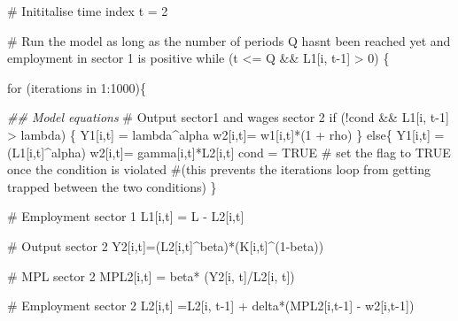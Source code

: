 \documentclass[
  letterpaper,
  DIV=11,
  numbers=noendperiod]{scrreprt}
\newenvironment{Shaded}{\begin{snugshade}}{\end{snugshade}}
\newcommand{\CommentTok}[1]{\textcolor[rgb]{0.37,0.37,0.37}{#1}}
\newcommand{\ConstantTok}[1]{\textcolor[rgb]{0.56,0.35,0.01}{#1}}
\newcommand{\ControlFlowTok}[1]{\textcolor[rgb]{0.00,0.23,0.31}{#1}}
\newcommand{\DecValTok}[1]{\textcolor[rgb]{0.68,0.00,0.00}{#1}}
\newcommand{\DocumentationTok}[1]{\textcolor[rgb]{0.37,0.37,0.37}{\textit{#1}}}
\newcommand{\NormalTok}[1]{\textcolor[rgb]{0.00,0.23,0.31}{#1}}
\newcommand{\OtherTok}[1]{\textcolor[rgb]{0.00,0.23,0.31}{#1}}
\newcommand{\SpecialCharTok}[1]{\textcolor[rgb]{0.37,0.37,0.37}{#1}}
\begin{document}
\begin{Shaded}
\begin{Highlighting}[]
  \CommentTok{\# Inititalise time index}
\NormalTok{  t }\OtherTok{=} \DecValTok{2}
  
  \CommentTok{\# Run the model as long as the number of periods Q hasn\textquotesingle{}t been reached yet and employment in sector 1 is positive }
  \ControlFlowTok{while}\NormalTok{ (t }\SpecialCharTok{\textless{}=}\NormalTok{ Q }\SpecialCharTok{\&\&}\NormalTok{ L1[i, t}\DecValTok{{-}1}\NormalTok{] }\SpecialCharTok{\textgreater{}} \DecValTok{0}\NormalTok{) \{}
    
   \ControlFlowTok{for}\NormalTok{ (iterations }\ControlFlowTok{in} \DecValTok{1}\SpecialCharTok{:}\DecValTok{1000}\NormalTok{)\{ }
      
      \DocumentationTok{\#\# Model equations}
      \CommentTok{\# Output sector1 and wages sector 2}
      \ControlFlowTok{if}\NormalTok{ (}\SpecialCharTok{!}\NormalTok{cond }\SpecialCharTok{\&\&}\NormalTok{ L1[i, t}\DecValTok{{-}1}\NormalTok{] }\SpecialCharTok{\textgreater{}}\NormalTok{ lambda) \{}
\NormalTok{      Y1[i,t] }\OtherTok{=}\NormalTok{ lambda}\SpecialCharTok{\^{}}\NormalTok{alpha}
\NormalTok{      w2[i,t]}\OtherTok{=}\NormalTok{ w1[i,t]}\SpecialCharTok{*}\NormalTok{(}\DecValTok{1} \SpecialCharTok{+}\NormalTok{ rho)}
\NormalTok{      \}}
      \ControlFlowTok{else}\NormalTok{\{}
\NormalTok{      Y1[i,t] }\OtherTok{=}\NormalTok{ (L1[i,t]}\SpecialCharTok{\^{}}\NormalTok{alpha)}
\NormalTok{      w2[i,t]}\OtherTok{=}\NormalTok{ gamma[i,t]}\SpecialCharTok{*}\NormalTok{L2[i,t]}
\NormalTok{      cond }\OtherTok{=} \ConstantTok{TRUE} \CommentTok{\# set the flag to TRUE once the condition is violated }
                  \CommentTok{\#(this prevents the iterations loop from getting trapped between the two conditions)}
\NormalTok{      \}}

      \CommentTok{\# Employment sector 1}
\NormalTok{      L1[i,t] }\OtherTok{=}\NormalTok{ L }\SpecialCharTok{{-}}\NormalTok{ L2[i,t]}
     
      \CommentTok{\# Output sector 2}
\NormalTok{      Y2[i,t]}\OtherTok{=}\NormalTok{(L2[i,t]}\SpecialCharTok{\^{}}\NormalTok{beta)}\SpecialCharTok{*}\NormalTok{(K[i,t]}\SpecialCharTok{\^{}}\NormalTok{(}\DecValTok{1}\SpecialCharTok{{-}}\NormalTok{beta))}

      \CommentTok{\# MPL sector 2}
\NormalTok{      MPL2[i,t] }\OtherTok{=}\NormalTok{ beta}\SpecialCharTok{*}\NormalTok{ (Y2[i, t]}\SpecialCharTok{/}\NormalTok{L2[i, t]) }
            
      \CommentTok{\# Employment sector 2 }
\NormalTok{      L2[i,t] }\OtherTok{=}\NormalTok{L2[i, t}\DecValTok{{-}1}\NormalTok{] }\SpecialCharTok{+}\NormalTok{ delta}\SpecialCharTok{*}\NormalTok{(MPL2[i,t}\DecValTok{{-}1}\NormalTok{] }\SpecialCharTok{{-}}\NormalTok{ w2[i,t}\DecValTok{{-}1}\NormalTok{])}
      

\end{Highlighting}
\end{Shaded}
\end{document}
